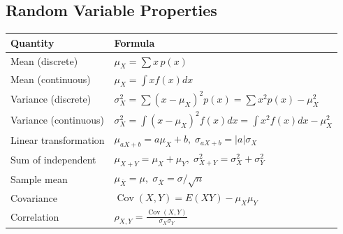 \documentclass[11pt]{article}
\begin{document}
\subsection*{Random Variable Properties}
\begin{center}
\begin{tabular}{l l}
\toprule
\textbf{Quantity} & \textbf{Formula} \\
\midrule
Mean (discrete) & \(\mu_X=\sum x\,p(x)\) \\
Mean (continuous) & \(\mu_X=\int x f(x)dx\) \\
Variance (discrete) & \(\sigma_X^2=\sum (x-\mu_X)^2 p(x)=\sum x^2 p(x)-\mu_X^2\) \\
Variance (continuous) & \(\sigma_X^2=\int (x-\mu_X)^2 f(x)dx=\int x^2 f(x)dx-\mu_X^2\) \\
Linear transformation & \(\mu_{aX+b}=a\mu_X+b,\; \sigma_{aX+b}=|a|\sigma_X\) \\
Sum of independent & \(\mu_{X+Y}=\mu_X+\mu_Y,\; \sigma_{X+Y}^2=\sigma_X^2+\sigma_Y^2\) \\
Sample mean & \(\mu_{\bar{X}}=\mu,\; \sigma_{\bar{X}}=\sigma/\sqrt{n}\) \\
Covariance & \(\operatorname{Cov}(X,Y)=E(XY)-\mu_X\mu_Y\) \\
Correlation & \(\rho_{X,Y}=\frac{\operatorname{Cov}(X,Y)}{\sigma_X\sigma_Y}\) \\
\bottomrule
\end{tabular}
\end{center}

\end{document}
